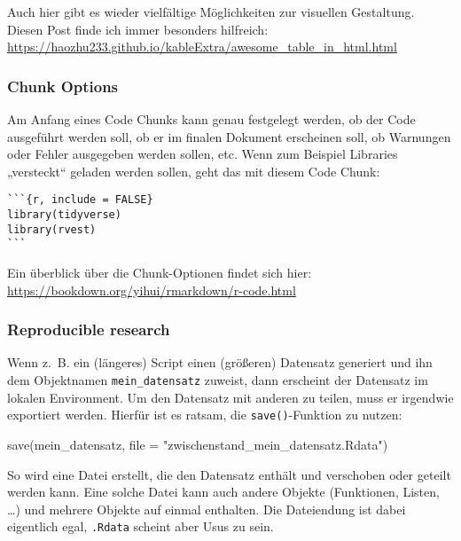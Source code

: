 \documentclass[11pt,german,a4paper]{article}
\newenvironment{Shaded}{\begin{snugshade}}{\end{snugshade}}
\newcommand{\AttributeTok}[1]{\textcolor[rgb]{0.77,0.63,0.00}{#1}}
\newcommand{\FunctionTok}[1]{\textcolor[rgb]{0.00,0.00,0.00}{#1}}
\newcommand{\NormalTok}[1]{#1}
\newcommand{\StringTok}[1]{\textcolor[rgb]{0.31,0.60,0.02}{#1}}
\begin{document}
Auch hier gibt es wieder vielfältige Möglichkeiten zur visuellen Gestaltung. Diesen Post finde ich immer besonders hilfreich: \url{https://haozhu233.github.io/kableExtra/awesome_table_in_html.html}

\hypertarget{chunk-options}{%
\subsubsection{Chunk Options}\label{chunk-options}}

Am Anfang eines Code Chunks kann genau festgelegt werden, ob der Code ausgeführt werden soll, ob er im finalen Dokument erscheinen soll, ob Warnungen oder Fehler ausgegeben werden sollen, etc. Wenn zum Beispiel Libraries „versteckt`` geladen werden sollen, geht das mit diesem Code Chunk:

\begin{verbatim}
```{r, include = FALSE}
library(tidyverse)
library(rvest)
```
\end{verbatim}

Ein überblick über die Chunk-Optionen findet sich hier: \url{https://bookdown.org/yihui/rmarkdown/r-code.html}

\hypertarget{reproducible-research}{%
\subsubsection{Reproducible research}\label{reproducible-research}}

Wenn z.~B. ein (längeres) Script einen (größeren) Datensatz generiert und ihn dem Objektnamen \texttt{mein\_datensatz} zuweist, dann erscheint der Datensatz im lokalen Environment. Um den Datensatz mit anderen zu teilen, muss er irgendwie exportiert werden. Hierfür ist es ratsam, die \texttt{save()}-Funktion zu nutzen:

\begin{Shaded}
\begin{Highlighting}[]
\FunctionTok{save}\NormalTok{(mein\_datensatz, }\AttributeTok{file =} \StringTok{"zwischenstand\_mein\_datensatz.Rdata"}\NormalTok{)}
\end{Highlighting}
\end{Shaded}

So wird eine Datei erstellt, die den Datensatz enthält und verschoben oder geteilt werden kann. Eine solche Datei kann auch andere Objekte (Funktionen, Listen, \ldots) und mehrere Objekte auf einmal enthalten. Die Dateiendung ist dabei eigentlich egal, \texttt{.Rdata} scheint aber Usus zu sein.
\end{document}
